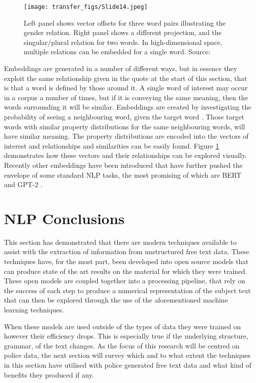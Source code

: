 \begin{figure}
  \texttt{[image: transfer\_figs/Slide14.jpeg]}
  \caption[Word Embeddings visual example]{Left panel shows vector offsets for three word pairs illustrating the gender relation. Right panel shows a different projection, and the singular/plural relation for two words. In high-dimensional space, multiple relations can be embedded for a single word. Source: \textcite{mikolov2013linguistic}}
  \label{fig:word}
\end{figure}

Embeddings are generated in a number of different ways, but in essence they exploit the same relationship given in the quote at the start of this section, that is that a word is defined by those around it. A single word of interest may occur in a corpus a number of times, but if it is conveying the same meaning, then the words surrounding it will be similar. Embeddings are created by investigating the probability of seeing a neighbouring word, given the target word \parencite{mikolov2013efficient}. Those target words with similar property distributions for the same neighbouring words, will have similar meaning. The property distributions are encoded into the vectors of interest and relationships and similarities can be easily found. Figure \ref{fig:word} demonstrates how these vectors and their relationships can be explored visually. Recently other embeddings have been introduced that have further pushed the envelope of some standard NLP tasks, the most promising of which are BERT \parencite{devlin2018bert} and GPT-2 \parencite{radford2019language}.


\section{ NLP Conclusions} This section has demonstrated that there are modern techniques available to assist with the extraction of information from unstructured free text data. These techniques have, for the most part, been developed into open source models that can produce state of the art results on the material for which they were trained. These open models are coupled together into a processing pipeline, that rely on the success of each step to produce a numerical representation of the subject text that can then be explored through the use of the aforementioned machine learning techniques.

When these models are used outside of the types of data they were trained on however their efficiency drops. This is especially true if the underlying structure, grammar, of the text changes. As the focus of this research will be centred on police data, the next section will survey which and to what extent the techniques in this section have utilised with police generated free text data and what kind of benefits they produced if any.  


